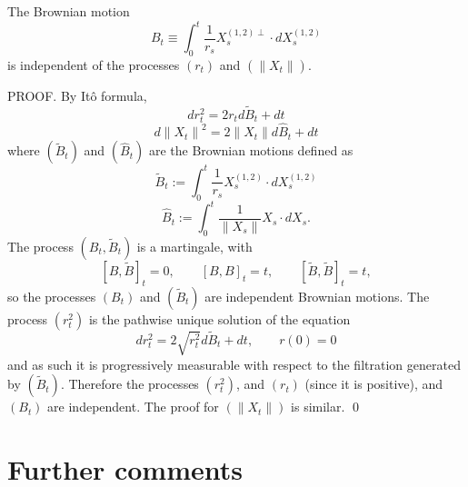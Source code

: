 \begin{lemma}
\label{lemma:skew-product}
The Brownian motion 
\begin{equation*}
B_{t} \equiv \int_{0}^{t}\frac{1}{r_{s}}X_{s}^{\left( 1,2\right) \perp }\cdot
dX_{s}^{\left( 1,2\right) }
\end{equation*}
is independent of the processes $\left( r_{t}\right) $ and $\left( \left\|
X_{t}\right\| \right) $. 

\end{lemma}

PROOF. By It\^{o} formula,
\begin{equation*}
dr_{t}^{2}=2r_{t}d\tilde{B}_{t}+dt
\end{equation*}
\begin{equation*}
d\left\| X_{t}\right\| ^{2}=2\left\| X_{t}\right\| d\hat{B}_{t}+dt
\end{equation*}
where $( \tilde{B}_{t} ) $ and $( \hat{B}_{t} ) $ are
the Brownian motions defined as
\begin{equation*}
\tilde{B}_{t}:=\int_{0}^{t}\frac{1}{r_{s}}X_{s}^{\left( 1,2\right) }\cdot
dX_{s}^{\left( 1,2\right) }
\end{equation*}
\begin{equation*}
\hat{B}_{t}:=\int_{0}^{t}\frac{1}{\left\| X_{s}\right\| }X_{s}\cdot dX_{s}.
\end{equation*}
The process $( B_{t},\tilde{B}_{t}) $ is a martingale, with 
$$
[ B,\tilde{B}] _{t}=0, \qquad [ B,B ] _{t}=t, 
\qquad [  \tilde{B},\tilde{B}] _{t}=t,
$$ 
so the processes $( B_{t} ) $
and $( \tilde{B}_{t} ) $ are independent Brownian motions. 
The process $( r_{t}^{2} ) $ is
the pathwise unique solution of the equation 
$$
dr_{t}^{2}=2\sqrt{r_{t}^{2}}d \tilde{B}_{t}+dt, \qquad r(0)=0
$$
 and as such it is
progressively measurable with respect to the filtration generated by $( 
\tilde{B}_{t} ) $. Therefore the processes $( r_{t}^{2} ) $,
and  $( r_{t} ) $ (since it is positive), and $(
B_{t} ) $ are independent. The proof for $( \| X_{t} \|) $ is similar. 
\qed

\section{Further comments}

